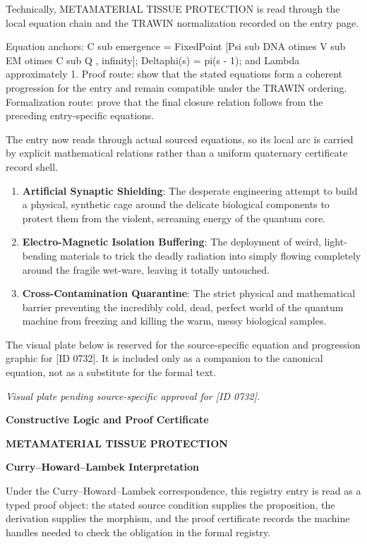 Technically, METAMATERIAL TISSUE PROTECTION is read through the local equation chain and the TRAWIN normalization recorded on the entry page.

Equation anchors: C sub emergence = FixedPoint [Psi sub DNA otimes V sub EM otimes C sub Q , infinity]; Deltaphi(s) = pi(s - 1); and Lambda approximately 1. Proof route: show that the stated equations form a coherent progression for the entry and remain compatible under the TRAWIN ordering. Formalization route: prove that the final closure relation follows from the preceding entry-specific equations.

The entry now reads through actual sourced equations, so its local arc is carried by explicit mathematical relations rather than a uniform quaternary certificate record shell.
\endgroup

\begin{enumerate}[leftmargin=1.6em,itemsep=6pt,topsep=4pt]
\item \textbf{Artificial Synaptic Shielding}: The desperate engineering attempt to build a physical, synthetic cage around the delicate biological components to protect them from the violent, screaming energy of the quantum core.
\item \textbf{Electro-Magnetic Isolation Buffering}: The deployment of weird, light-bending materials to trick the deadly radiation into simply flowing completely around the fragile wet-ware, leaving it totally untouched.
\item \textbf{Cross-Contamination Quarantine}: The strict physical and mathematical barrier preventing the incredibly cold, dead, perfect world of the quantum machine from freezing and killing the warm, messy biological samples.
\end{enumerate}

\begingroup\footnotesize\sloppy
The visual plate below is reserved for the source-specific equation and progression graphic for [ID 0732]. It is included only as a companion to the canonical equation, not as a substitute for the formal text.
\par\endgroup
\begingroup\footnotesize\itshape
Visual plate pending source-specific approval for [ID 0732].
\par\endgroup

\clearpage
\begingroup\tzpsupportsetup
\noindent\textbf{\fontsize{10.8pt}{12.8pt}\selectfont [ID 0732] Constructive Logic and Proof Certificate}\par
\noindent\textbf{\fontsize{10pt}{12pt}\selectfont METAMATERIAL TISSUE PROTECTION}\par
\vspace{0.45em}
\begingroup
\footnotesize
\setlength{\parskip}{0.22em}
\setlength{\parindent}{0pt}
\noindent\textbf{Curry--Howard--Lambek Interpretation}\par
Under the Curry--Howard--Lambek correspondence, this registry entry is read as a typed proof
object: the stated source condition supplies the proposition, the derivation supplies the
morphism, and the proof certificate records the machine handles needed to check the obligation
in the formal registry.

